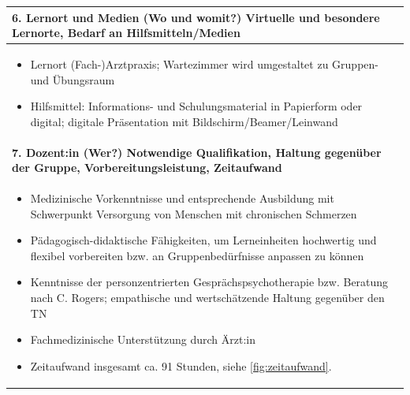 \documentclass[
  twoside,
  parskip=half-,
]{scrreprt}
\begin{document}
\begin{center}
\begin{longtable}{p{}}
    \bfseries 6. Lernort und Medien (Wo und womit?) \newline
    Virtuelle und besondere Lernorte, Bedarf an Hilfsmitteln/Medien \\\hline
    \begin{itemize}[nosep, topsep=-10pt]
    \item Lernort (Fach-)Arztpraxis; Wartezimmer wird umgestaltet zu Gruppen- und Übungsraum
    \item Hilfsmittel: Informations- und Schulungsmaterial in Papierform oder digital; digitale Präsentation mit Bildschirm/Beamer/Leinwand 
    \end{itemize} \\\hline
    \bfseries 7. Dozent:in (Wer?) \newline
    Notwendige Qualifikation, Haltung gegenüber der Gruppe, Vorbereitungsleistung, Zeitaufwand \\\hline
    \begin{itemize}[nosep, topsep=-\parskip]
    \item Medizinische Vorkenntnisse und entsprechende Ausbildung mit Schwerpunkt Versorgung von Menschen mit chronischen Schmerzen
    \item Pädagogisch-didaktische Fähigkeiten, um Lerneinheiten hochwertig und flexibel vorbereiten bzw. an Gruppenbedürfnisse anpassen zu können
    \item Kenntnisse der personzentrierten Gesprächspsychotherapie bzw. Beratung nach C. Rogers; empathische und wertschätzende Haltung gegenüber den TN
    \item Fachmedizinische Unterstützung durch Ärzt:in
    \item Zeitaufwand insgesamt ca. 91 Stunden, siehe \autoref{fig:zeitaufwand}.
    \end{itemize} \\\hline
  \end{longtable}
\end{center}
\end{document}
